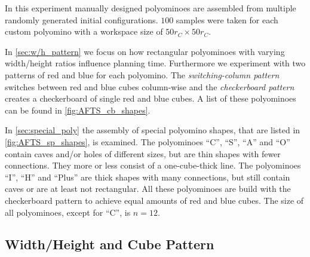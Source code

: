 
In this experiment manually designed polyominoes are assembled from multiple randomly generated initial configurations.
$100$ samples were taken for each custom polyomino with a workspace size of $50 r_C \times 50 r_C$.

In \autoref{sec:w/h_pattern} we focus on how rectangular polyominoes with varying width/height ratios influence planning time.
Furthermore we experiment with two patterns of red and blue for each polyomino.
The \textit{switching-column pattern} switches between red and blue cubes column-wise and the \textit{checkerboard pattern} creates a checkerboard of single red and blue cubes.
A list of these polyominoes can be found in \autoref{fig:AFTS_cb_shapes}.

In \autoref{sec:special_poly} the assembly of special polyomino shapes, that are listed in \autoref{fig:AFTS_sp_shapes}, is examined. 
The polyominoes ``C'', ``S'', ``A'' and ``O'' contain caves and/or holes of different sizes, but are thin shapes with fewer connections.
They more or less consist of a one-cube-thick line.
The polyominoes ``I'', ``H'' and ``Plus'' are thick shapes with many connections, but still contain caves or are at least not rectangular.
All these polyominoes are build with the checkerboard pattern to achieve equal amounts of red and blue cubes.
The size of all polyominoes, except for ``C'', is $n=12$.
 

\subsection{Width/Height and Cube Pattern}
\label{sec:w/h_pattern}


